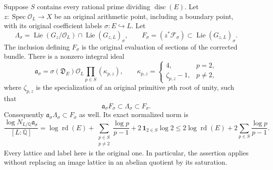 \begin{theorem}
\label{thm:actual-hodge-specialization}
Suppose $S$ contains every rational prime dividing
$\operatorname{disc}(E)$. Let $z:\operatorname{Spec}\mathcal O_L\to X$
be an original arithmetic point, including a boundary point, with
its original coefficient labels $\sigma:E\hookrightarrow L$.
Let
\[
 \Lambda_\sigma
   =\operatorname{Lie}(G_z/\mathcal O_L)
                   \cap\operatorname{Lie}(G_{z,L})_\sigma,
 \qquad
 F_\sigma=(z^*\mathcal F_\sigma)
                   \subset\operatorname{Lie}(G_{z,L})_\sigma.
\]
The inclusion defining $F_\sigma$ is the original evaluation of
sections of the corrected bundle. There is a nonzero integral ideal
\[
 \mathfrak a_\sigma
   =\sigma(\mathfrak D_E)\mathcal O_L
                   \prod_{p\in S}(\kappa_{p,z}),
 \qquad
 \kappa_{p,z}=
 \begin{cases}
  4,&p=2,\\
  \zeta_{p,z}-1,&p\ne2,
 \end{cases}
 \tag{HS2}
\]
where $\zeta_{p,z}$ is the specialization of an original primitive
$p$th root of unity, such that
\begin{equation}\label{eq:actual-hodge-inclusions}
 \mathfrak a_\sigma F_\sigma\subset\Lambda_\sigma\subset F_\sigma.
\end{equation}
Consequently $\mathfrak a_\sigma\Lambda_\sigma\subset F_\sigma$ as
well. Its exact normalized norm is
\begin{equation}\label{eq:actual-hodge-ideal-norm}
 \frac{\log N_{L/\mathbb Q}\mathfrak a_\sigma}{[L:\mathbb Q]}
 =\log\operatorname{rd}(E)
  +\sum_{\substack{p\in S\\p\ne2}}\frac{\log p}{p-1}
  +2\,\mathbf 1_{2\in S}\log2
 \le 2\log\operatorname{rd}(E)
       +2\sum_{p\in S}\frac{\log p}{p-1}.
\end{equation}
Every lattice and label here is the original one. In particular,
the assertion applies without replacing an image lattice in an
abelian quotient by its saturation.
\end{theorem}

